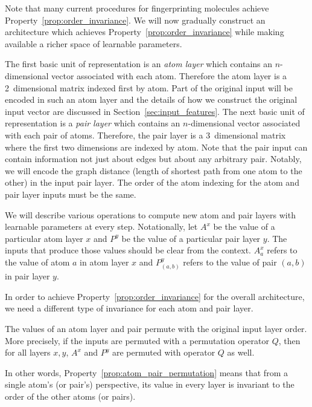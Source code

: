 Note that many current procedures for fingerprinting molecules achieve
Property~\ref{prop:order_invariance}. We will now gradually construct an
architecture which achieves Property~\ref{prop:order_invariance} while
making available a richer space of learnable parameters.

The first basic unit of representation is an \emph{atom layer} which
contains an $n$-dimensional vector associated with each atom. Therefore the
atom layer is a 2~dimensional matrix indexed first by atom. Part of the original
input will be encoded in such an atom layer and the details of how we construct
the original input vector are discussed in Section~\ref{sec:input_features}. The
next basic unit of representation is a \emph{pair layer} which contains an
$n$-dimensional vector associated with each pair of atoms. Therefore, the pair
layer is a 3~dimensional matrix where the first two dimensions are indexed by
atom. Note that the pair input can contain information not just about edges but
about any arbitrary pair. Notably, we will encode the graph distance (length of
shortest path from one atom to the other) in the input pair layer. The order of
the atom indexing for the atom and pair layer inputs must be the same.

We will describe various operations to compute new atom and pair layers with
learnable parameters at every step. Notationally, let $A^x$ be the value of a
particular atom layer $x$ and $P^y$ be the value of a particular pair layer
$y$. The inputs that produce those values should be clear from the
context. $A^x_a$ refers to the value of atom $a$ in atom layer $x$ and
$P^y_{(a,b)}$ refers to the value of pair $(a,b)$ in pair layer $y$.

In order to achieve Property~\ref{prop:order_invariance} for the overall
architecture, we need a different type of invariance for each atom and pair
layer.

\begin{property}
  \label{prop:atom_pair_permutation}
  The values of an atom layer and pair permute with the original input layer
  order. More precisely, if the inputs are permuted with a permutation operator
  $Q$, then for all layers $x, y$, $A^x$ and $P^y$ are permuted with operator
  $Q$ as well.
\end{property}

In other words, Property~\ref{prop:atom_pair_permutation} means that from a
single atom's (or pair's) perspective, its value in every layer is invariant to
the order of the other atoms (or pairs).

